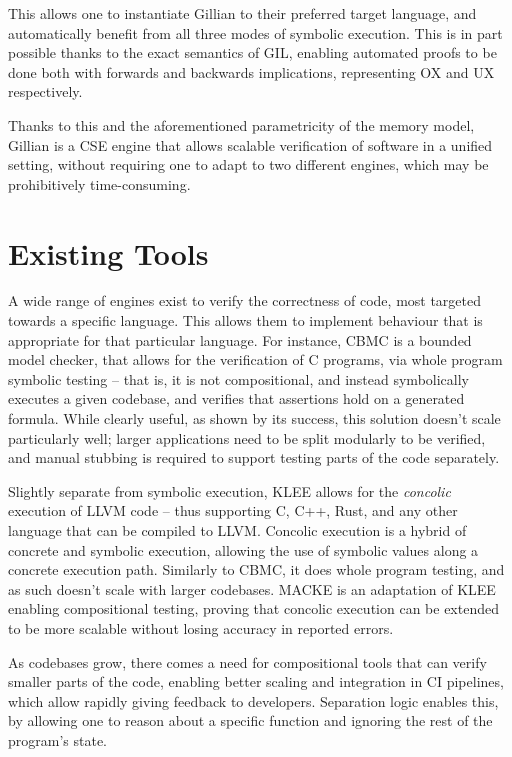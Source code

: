 This allows one to instantiate Gillian to their preferred target language, and automatically benefit from all three modes of symbolic execution. This is in part possible thanks to the exact \cite{exactsl} semantics of GIL, enabling automated proofs to be done both with forwards and backwards implications, representing OX and UX respectively.

Thanks to this and the aforementioned parametricity of the memory model, Gillian is a CSE engine that allows scalable verification of software in a unified setting, without requiring one to adapt to two different engines, which may be prohibitively time-consuming.

\section{Existing Tools} \label{sec:existing-tools}

A wide range of engines exist to verify the correctness of code, most targeted towards a specific language. This allows them to implement behaviour that is appropriate for that particular language.
For instance, CBMC \cite{cbmc} is a bounded model checker, that allows for the verification of C programs, via whole program symbolic testing -- that is, it is not compositional, and instead symbolically executes a given codebase, and verifies that assertions hold on a generated formula. While clearly useful, as shown by its success, this solution doesn't scale particularly well; larger applications need to be split modularly to be verified, and manual stubbing is required to support testing parts of the code separately.

Slightly separate from symbolic execution, KLEE \cite{klee} allows for the \emph{concolic} execution of LLVM code -- thus supporting C, C++, Rust, and any other language that can be compiled to LLVM. Concolic execution is a hybrid of concrete and symbolic execution, allowing the use of symbolic values along a concrete execution path. Similarly to CBMC, it does whole program testing, and as such doesn't scale with larger codebases. MACKE \cite{macke} is an adaptation of KLEE enabling compositional testing, proving that concolic execution can be extended to be more scalable without losing accuracy in reported errors.

As codebases grow, there comes a need for compositional tools that can verify smaller parts of the code, enabling better scaling and integration in CI pipelines, which allow rapidly giving feedback to developers. Separation logic enables this, by allowing one to reason about a specific function and ignoring the rest of the program's state.


